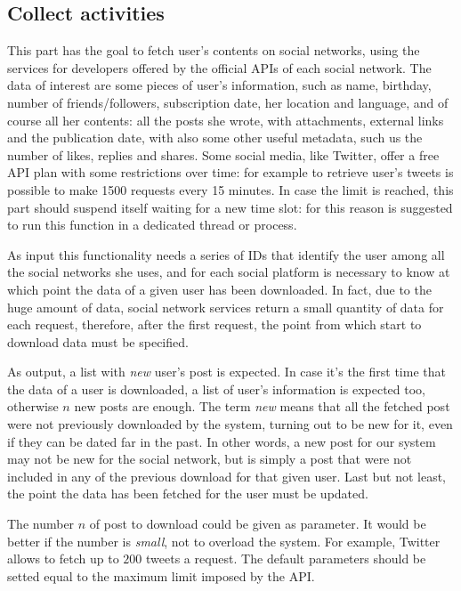 \subsection{Collect activities}
This part has the goal to fetch user's contents on social networks, using the services for developers offered by the official APIs of each social network. The data of interest are some pieces of user's information, such as name, birthday, number of friends/followers, subscription date, her location and language, and of course all her contents: all the posts she wrote, with attachments, external links and the publication date, with also some other useful metadata, such us the number of likes, replies and shares. Some social media, like Twitter, offer a free API plan with some restrictions over time: for example to retrieve user's tweets is possible to make 1500 requests every 15 minutes. In case the limit is reached, this part should suspend itself waiting for a new time slot: for this reason is suggested to run this function in a dedicated thread or process.

As input this functionality needs a series of IDs that identify the user among all the social networks she uses, and for each social platform is necessary to know at which point the data of a given user has been downloaded. In fact, due to the huge amount of data, social network services return a small quantity of data for each request, therefore, after the first request, the point from which start to download data must be specified.

As output, a list with \textit{new} user's post is expected. In case it's the first time that the data of a user is downloaded, a list of user's information is expected too, otherwise $ n $ new posts are enough. The term \textit{new} means that all the fetched post were not previously downloaded by the system, turning out to be new for it, even if they can be dated far in the past. In other words, a new post for our system may not be new for the social network, but is simply a post that were not included in any of the previous download for that given user. Last but not least, the point the data has been fetched for the user must be updated.

The number $ n $ of post to download could be given as parameter. It would be better if the number is \textit{small}, not to overload the system. For example, Twitter allows to fetch up to $ 200 $ tweets a request. The default parameters should be setted equal to the maximum limit imposed by the API.


